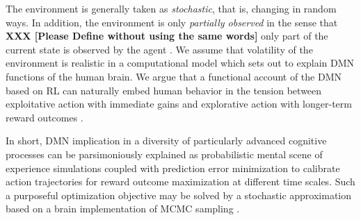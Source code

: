 \documentclass[10pt,letterpaper]{article}
\begin{document}
The environment is generally taken as \textit{stochastic},
that is, changing in random ways. In addition,
the environment is only \textit{partially observed}
in the sense that \textbf{XXX [Please Define without using the same words]}
only part of the current state is observed by
the agent \citep{starkweather2017dopamine}.
We assume that volatility of the environment
is realistic in a computational model which sets out
to explain DMN functions of the human brain.
We argue that a functional account of the DMN based on RL
can naturally embed human behavior
in the tension between exploitative action with immediate gains and
explorative action with longer-term reward outcomes
\citep{dayan2008decision}.


In short, DMN implication in a diversity of
particularly advanced cognitive processes
can be parsimoniously explained as probabilistic mental
scene of experience simulations coupled with prediction error minimization
to calibrate action trajectories for
reward outcome maximization at different time scales.
Such a purposeful optimization objective
may be solved by a stochastic approximation
based on a brain implementation of MCMC sampling
\citep{tenenbaum2011grow}.
\end{document}

